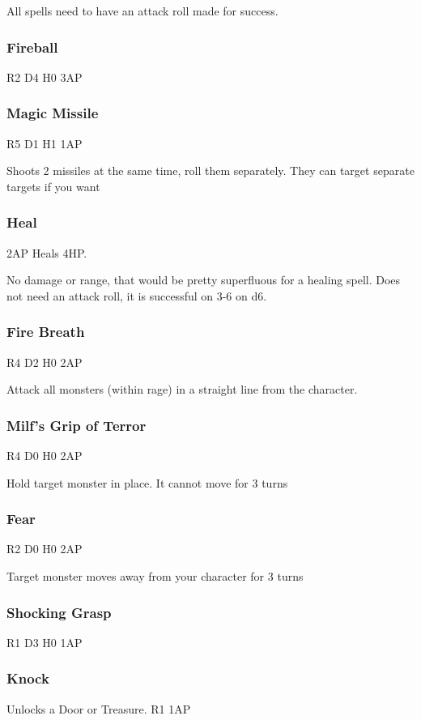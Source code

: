 \documentclass[a6paper,hidelinks]{article}
\begin{document}
All spells need to have an attack roll made for success.

\subsubsection{Fireball}
R2 D4 H0 3AP

\subsubsection{Magic Missile}
R5 D1 H1 1AP

Shoots 2 missiles at the same time, roll them separately. They can target separate targets if you want

\subsubsection{Heal}
2AP Heals 4HP.

No damage or range, that would be pretty superfluous for a healing spell. Does not need an attack roll, it is successful on 3-6 on d6.

\subsubsection{Fire Breath}
R4 D2 H0 2AP

Attack all monsters (within rage) in a straight line from the character.

\subsubsection{Milf's Grip of Terror}
R4 D0 H0 2AP

Hold target monster in place. It cannot move for 3 turns

\subsubsection{Fear}
R2 D0 H0 2AP

Target monster moves away from your character for 3 turns

\subsubsection{Shocking Grasp}
R1 D3 H0 1AP

\subsubsection{Knock}
Unlocks a Door or Treasure. R1 1AP
\end{document}
